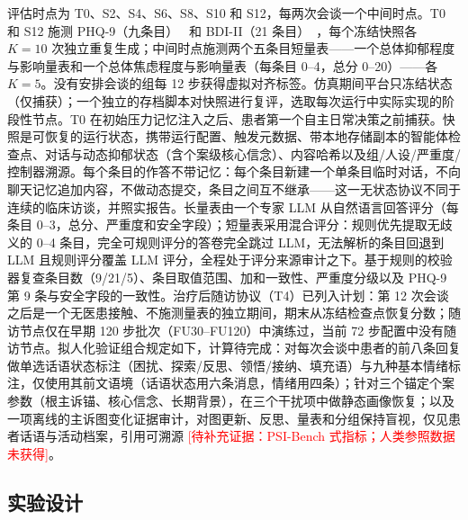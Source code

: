 \documentclass[11pt,a4paper]{article}
\newcommand{\ph}[1]{\textcolor{red}{[#1]}}
\begin{document}
评估时点为 T0、S2、S4、S6、S8、S10 和 S12，每两次会谈一个中间时点。T0 和 S12 施测 PHQ-9（九条目）~\cite{kroenke2001} 和 BDI-II（21 条目）~\cite{beck1996}，每个冻结快照各 $K=10$ 次独立重复生成；中间时点施测两个五条目短量表——一个总体抑郁程度与影响量表和一个总体焦虑程度与影响量表（每条目 0--4，总分 0--20）——各 $K=5$。没有安排会谈的组每 12 步获得虚拟对齐标签。仿真期间平台只冻结状态（仅捕获）；一个独立的存档脚本对快照进行复评，选取每次运行中实际实现的阶段性节点。T0 在初始压力记忆注入之后、患者第一个自主日常决策之前捕获。快照是可恢复的运行状态，携带运行配置、触发元数据、带本地存储副本的智能体检查点、对话与动态抑郁状态（含个案级核心信念）、内容哈希以及组/人设/严重度/控制器溯源。每个条目的作答不带记忆：每个条目新建一个单条目临时对话，不向聊天记忆追加内容，不做动态提交，条目之间互不继承——这一无状态协议不同于连续的临床访谈，并照实报告。长量表由一个专家 LLM 从自然语言回答评分（每条目 0--3，总分、严重度和安全字段）；短量表采用混合评分：规则优先提取无歧义的 0--4 条目，完全可规则评分的答卷完全跳过 LLM，无法解析的条目回退到 LLM 且规则评分覆盖 LLM 评分，全程处于评分来源审计之下。基于规则的校验器复查条目数（9/21/5）、条目取值范围、加和一致性、严重度分级以及 PHQ-9 第 9 条与安全字段的一致性。治疗后随访协议（T4）已列入计划：第 12 次会谈之后是一个无医患接触、不施测量表的独立期间，期末从冻结检查点恢复分数；随访节点仅在早期 120 步批次（FU30--FU120）中演练过，当前 72 步配置中没有随访节点。拟人化验证组合规定如下，计算待完成：对每次会谈中患者的前八条回复做单选话语状态标注（困扰、探索/反思、领悟/接纳、填充语）与九种基本情绪标注，仅使用其前文语境（话语状态用六条消息，情绪用四条）；针对三个锚定个案参数（根主诉锚、核心信念、长期背景），在三个干扰项中做静态画像恢复；以及一项离线的主诉图变化证据审计，对图更新、反思、量表和分组保持盲视，仅见患者话语与活动档案，引用可溯源 \ph{待补充证据：PSI-Bench 式指标；人类参照数据未获得}。

\subsection*{实验设计}
\end{document}

